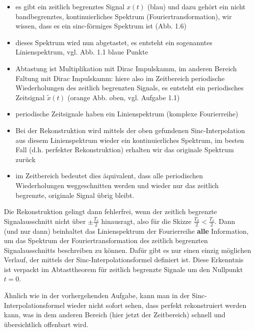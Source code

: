\begin{itemize}
  \item es gibt ein zeitlich begrenztes Signal $x(t)$ (blau)
  und dazu gehört ein nicht bandbegrenztes, kontinuierliches Spektrum
  (Fouriertransformation), wir wissen, dass es ein sinc-förmiges Spektrum ist (Abb. 1.6)
  \item dieses Spektrum wird nun abgetastet, es entsteht ein sogenanntes
  Linienspektrum, vgl. Abb. 1.1 blaue Punkte
  \item Abtastung ist Multiplikation mit Dirac Impulskamm, im anderen Bereich
  Faltung mit Dirac Impulskamm:
  hiere also im Zeitbereich periodische Wiederholungen
  des zeitlich begrenzten Signals, es entsteht ein periodisches Zeitsignal
  $\tilde{x}(t)$ (orange Abb. oben, vgl. Aufgabe 1.1)
  \item periodische Zeitsignale haben ein Linienspektrum (komplexe Fourierreihe)
  \item Bei der Rekonstruktion wird mittels der oben gefundenen Sinc-Interpolation
  aus diesem Linienspektrum wieder ein kontinuierliches Spektrum, im besten
  Fall (d.h. perfekter Rekonstruktion) erhalten wir das originale Spektrum zurück
  \item im Zeitbereich bedeutet dies äquivalent, dass alle periodischen
  Wiederholungen weggeschnitten werden und wieder nur das zeitlich begrenzte,
  originale Signal übrig bleibt.
\end{itemize}
Die Rekonstruktion gelingt dann fehlerfrei, wenn der zeitlich begrenzte
Signalausschnitt nicht über $\pm \frac{T_s}{2}$ hinausragt, also für die Skizze
$\frac{T_h}{2}<\frac{T_s}{2}$. Dann (und nur dann)
beinhaltet das Linienspektrum der Fourierreihe \textbf{alle} Information,
um das Spektrum der Fouriertransformation
des zeitlich begrenzten Signalausschnitts beschreiben zu können. Dafür gibt es
nur einen einzig möglichen Verlauf, der mittels der Sinc-Interpolationsformel
definiert ist. Diese Erkenntnis ist verpackt im Abtasttheorem für
zeitlich begrenzte Signale um den Nullpunkt $t=0$.

Ähnlich wie in der vorhergehenden Aufgabe, kann man in der Sinc-Interpolationsformel
wieder nicht sofort sehen, dass perfekt rekonstruiert werden kann, was in dem anderen
Bereich (hier jetzt der Zeitbereich) schnell und übersichtlich offenbart wird.

\newpage
